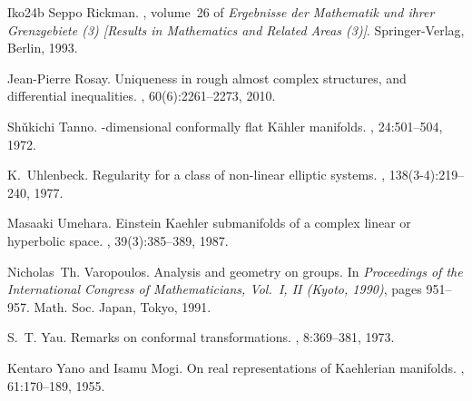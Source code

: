 \documentclass[a4paper,leqno,11pt]{amsart}
\numberwithin{equation}{section}
\theoremstyle{remark}
\theoremstyle{remark}
\begin{document}
\begin{thebibliography}{{Iko}24b}
Seppo Rickman.
, volume~26 of {\em {Ergebnisse der Mathematik und ihrer Grenzgebiete (3) [Results in Mathematics and Related Areas (3)]}}.
\newblock Springer-Verlag, Berlin, 1993.

Jean-Pierre Rosay.
\newblock Uniqueness in rough almost complex structures, and differential inequalities.
, 60(6):2261--2273, 2010.

Sh\v{u}kichi Tanno.
-dimensional conformally flat {K}\"{a}hler manifolds.
, 24:501--504, 1972.

K.~Uhlenbeck.
\newblock Regularity for a class of non-linear elliptic systems.
, 138(3-4):219--240, 1977.

Masaaki Umehara.
\newblock Einstein {K}aehler submanifolds of a complex linear or hyperbolic space.
, 39(3):385--389, 1987.

Nicholas~Th. Varopoulos.
\newblock Analysis and geometry on groups.
\newblock In {\em Proceedings of the {I}nternational {C}ongress of {M}athematicians, {V}ol.\ {I}, {II} ({K}yoto, 1990)}, pages 951--957. Math. Soc. Japan, Tokyo, 1991.

S.~T. Yau.
\newblock Remarks on conformal transformations.
, 8:369--381, 1973.

Kentaro Yano and Isamu Mogi.
\newblock On real representations of {K}aehlerian manifolds.
, 61:170--189, 1955.

\end{thebibliography}
\end{document}
